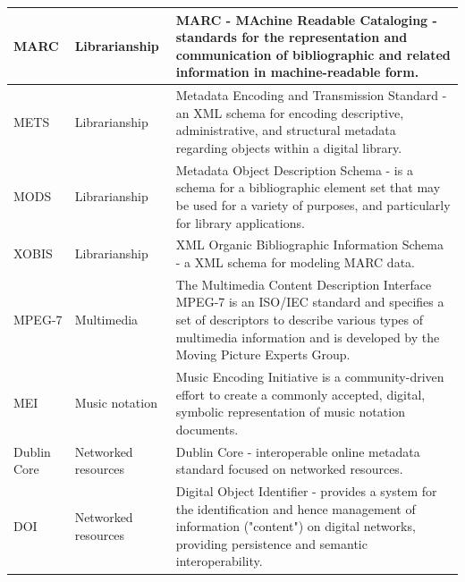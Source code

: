 \documentclass[epsfig,a4paper,12pt,titlepage]{book}
\begin{document}
\begin{table}[h]
\begin{adjustbox}{width=\textwidth}
\begin{tabular}{|p{1.5cm}|p{3.5cm}|p{14.0cm}|}
MARC & Librarianship & MARC - MAchine Readable Cataloging - standards for the representation and communication of bibliographic and related information in machine-readable form. \\ \hline
METS & Librarianship & Metadata Encoding and Transmission Standard - an XML schema for encoding descriptive, administrative, and structural metadata regarding objects within a digital library. \\ \hline
MODS & Librarianship & Metadata Object Description Schema - is a schema for a bibliographic element set that may be used for a variety of purposes, and particularly for library applications. \\ \hline
XOBIS & Librarianship & XML Organic Bibliographic Information Schema - a XML schema for modeling MARC data. \\ \hline
MPEG-7 & Multimedia & The Multimedia Content Description Interface MPEG-7 is an ISO/IEC standard and specifies a set of descriptors to describe various types of multimedia information and is developed by the Moving Picture Experts Group. \\ \hline
MEI & Music notation & Music Encoding Initiative is a community-driven effort to create a commonly accepted, digital, symbolic representation of music notation documents. \\ \hline
Dublin Core & Networked resources & Dublin Core - interoperable online metadata standard focused on networked resources. \\ \hline
DOI & Networked resources & Digital Object Identifier - provides a system for the identification and hence management of information ("content") on digital networks, providing persistence and semantic interoperability. \\ \hline


\end{tabular}
\end{adjustbox}
\end{table}
\end{document}
